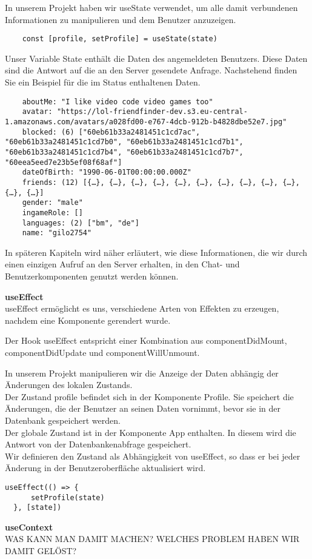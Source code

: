 In unserem Projekt haben wir useState verwendet, um alle damit verbundenen Informationen zu manipulieren und dem Benutzer anzuzeigen.
\begin{lstlisting}
    const [profile, setProfile] = useState(state)    
    \end{lstlisting}

\newpage
Unser Variable State enthält die Daten des angemeldeten Benutzers. Diese Daten sind die Antwort auf die an den Server gesendete Anfrage. 
Nachstehend finden Sie ein Beispiel für die im Status enthaltenen Daten.

\begin{lstlisting}
    aboutMe: "I like video code video games too"
    avatar: "https://lol-friendfinder-dev.s3.eu-central-1.amazonaws.com/avatars/a028fd00-e767-4dcb-912b-b4828dbe52e7.jpg"
    blocked: (6) ["60eb61b33a2481451c1cd7ac", "60eb61b33a2481451c1cd7b0", "60eb61b33a2481451c1cd7b1", "60eb61b33a2481451c1cd7b4", "60eb61b33a2481451c1cd7b7", "60eea5eed7e23b5ef08f68af"]
    dateOfBirth: "1990-06-01T00:00:00.000Z"
    friends: (12) [{…}, {…}, {…}, {…}, {…}, {…}, {…}, {…}, {…}, {…}, {…}, {…}]
    gender: "male"
    ingameRole: []
    languages: (2) ["bm", "de"]
    name: "gilo2754"
\end{lstlisting}
In späteren Kapiteln wird näher erläutert, wie diese Informationen, die wir durch einen einzigen Aufruf an den Server erhalten, in den Chat- und Benutzerkomponenten genutzt werden können. 

\textbf{useEffect}\\
useEffect ermöglicht es uns, verschiedene Arten von Effekten zu erzeugen, nachdem eine Komponente gerendert wurde. 

Der Hook useEffect entspricht einer Kombination aus componentDidMount, componentDidUpdate und componentWillUnmount.

In unserem Projekt manipulieren wir die Anzeige der Daten abhängig der Änderungen des lokalen Zustands.\\
Der Zustand profile befindet sich in der Komponente Profile.
Sie speichert die Änderungen, die der Benutzer an seinen Daten vornimmt, bevor sie in der Datenbank gespeichert werden.
\\
Der globale Zustand ist in der Komponente App enthalten.
In diesem wird die Antwort von der Datenbankenabfrage gespeichert.
\\
Wir definieren den Zustand als  Abhängigkeit von useEffect, so dass er bei jeder Änderung in der Benutzeroberfläche aktualisiert wird.
\\
\begin{lstlisting}
useEffect(() => { 
      setProfile(state)      
  }, [state])           
\end{lstlisting}

  
\textbf{useContext} \\
WAS KANN MAN DAMIT MACHEN?
WELCHES PROBLEM HABEN WIR DAMIT GELÖST?




